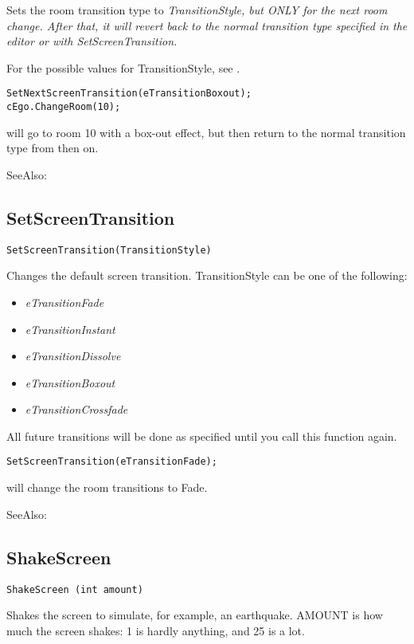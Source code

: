 Sets the room transition type to \it{TransitionStyle}, but ONLY for the next room change. After
that, it will revert back to the normal transition type specified in the editor or with
SetScreenTransition.

For the possible values for TransitionStyle, see .

\begin{verbatim}
SetNextScreenTransition(eTransitionBoxout);
cEgo.ChangeRoom(10);
\end{verbatim}
will go to room 10 with a box-out effect, but then return to the normal transition
type from then on.

SeeAlso: 


\subsection{SetScreenTransition}\label{SetScreenTransition}%

\begin{verbatim}
SetScreenTransition(TransitionStyle)
\end{verbatim}
Changes the default screen transition. TransitionStyle can be one of the following:
\begin{itemize}
\item \it{eTransitionFade}
\item \it{eTransitionInstant}
\item \it{eTransitionDissolve}
\item \it{eTransitionBoxout}
\item \it{eTransitionCrossfade}
\end{itemize}
All future transitions will be done as specified until you call this
function again.

\begin{verbatim}
SetScreenTransition(eTransitionFade);
\end{verbatim}
will change the room transitions to Fade.

SeeAlso: 


\subsection{ShakeScreen}\label{ShakeScreen}%

\begin{verbatim}
ShakeScreen (int amount)
\end{verbatim}
Shakes the screen to simulate, for example, an earthquake. AMOUNT is
how much the screen shakes: 1 is hardly anything, and 25 is a lot.

